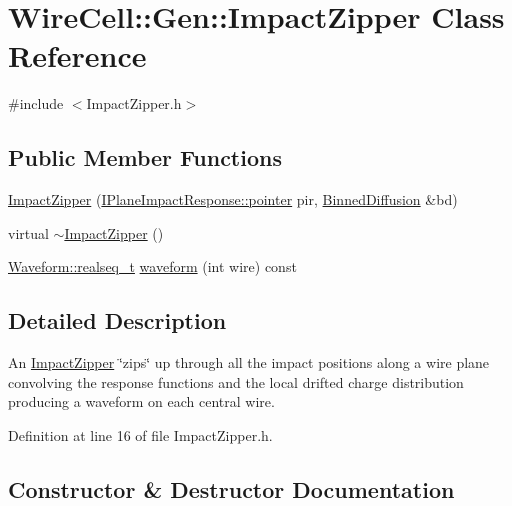 \hypertarget{class_wire_cell_1_1_gen_1_1_impact_zipper}{}\section{Wire\+Cell\+:\+:Gen\+:\+:Impact\+Zipper Class Reference}
\label{class_wire_cell_1_1_gen_1_1_impact_zipper}


{\ttfamily \#include $<$Impact\+Zipper.\+h$>$}

\subsection*{Public Member Functions}
\begin{DoxyCompactItemize}
\item 
\hyperlink{class_wire_cell_1_1_gen_1_1_impact_zipper_a6bcfa16f6532464dd52cd01f58722594}{Impact\+Zipper} (\hyperlink{class_wire_cell_1_1_interface_a09c548fb8266cfa39afb2e74a4615c37}{I\+Plane\+Impact\+Response\+::pointer} pir, \hyperlink{class_wire_cell_1_1_gen_1_1_binned_diffusion}{Binned\+Diffusion} \&bd)
\item 
virtual \hyperlink{class_wire_cell_1_1_gen_1_1_impact_zipper_a1c530ae00e741ecf8966371dbd12d85e}{$\sim$\+Impact\+Zipper} ()
\item 
\hyperlink{namespace_wire_cell_1_1_waveform_a479175e541c8545e87cd8063b74b6956}{Waveform\+::realseq\+\_\+t} \hyperlink{class_wire_cell_1_1_gen_1_1_impact_zipper_a542bc19237317cce10742ae097e647ec}{waveform} (int wire) const
\end{DoxyCompactItemize}


\subsection{Detailed Description}
An \hyperlink{class_wire_cell_1_1_gen_1_1_impact_zipper}{Impact\+Zipper} \char`\"{}zips\char`\"{} up through all the impact positions along a wire plane convolving the response functions and the local drifted charge distribution producing a waveform on each central wire. 

Definition at line 16 of file Impact\+Zipper.\+h.



\subsection{Constructor \& Destructor Documentation}
\mbox{\label{class_wire_cell_1_1_gen_1_1_impact_zipper_a6bcfa16f6532464dd52cd01f58722594}} 
